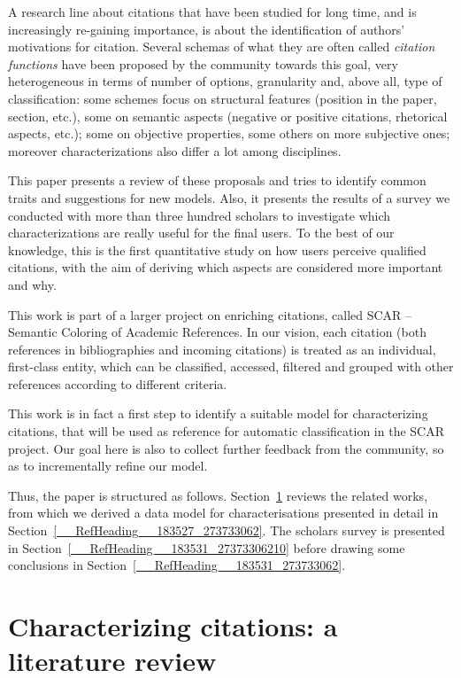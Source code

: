 \documentclass[runningheads,a4paper]{llncs}
\begin{document}
A research line about citations that have been studied for long time, and is increasingly re-gaining importance, is about the identification of authors' motivations for citation. Several schemas of what they are often called {\em citation functions} have been proposed by the community towards this goal, very heterogeneous in terms of number of options, granularity and, above all, type of classification: some schemes focus on structural features (position in the paper, section, etc.), some on semantic aspects (negative or positive citations, rhetorical aspects, etc.); some on objective properties, some others on more subjective ones; moreover characterizations also differ a lot among disciplines.

This paper presents a review of these proposals and tries to identify common traits and suggestions for new models. Also, it presents the results of a survey we conducted with more than three hundred scholars to investigate which characterizations are really useful for the final users. To the best of our knowledge, this is the first quantitative study on how users perceive qualified citations, with the aim of deriving which aspects are considered more important and why.

This work is part of a larger project on enriching citations, called SCAR -- Semantic Coloring of Academic References. In our vision, each citation (both references in bibliographies and incoming citations) is treated as an individual, first-class entity, which can be classified, accessed, filtered and grouped with other references according to different criteria.

This work is in fact a first step to identify a suitable model for characterizing citations, that will be used as reference for automatic classification in the SCAR project. Our goal here is also to collect further feedback from the community, so as to incrementally refine our model.

Thus, the paper is structured as follows. Section~\ref{__RefHeading__183509_273733062} reviews the related works, from which we derived a data model for characterisations presented in detail in Section~\ref{__RefHeading__183527_273733062}. The scholars survey is presented in Section~\ref{__RefHeading__183531_27373306210} before drawing some conclusions in Section~\ref{__RefHeading__183531_273733062}.

\section{Characterizing citations: a literature review}\label{__RefHeading__183509_273733062}
\end{document}
